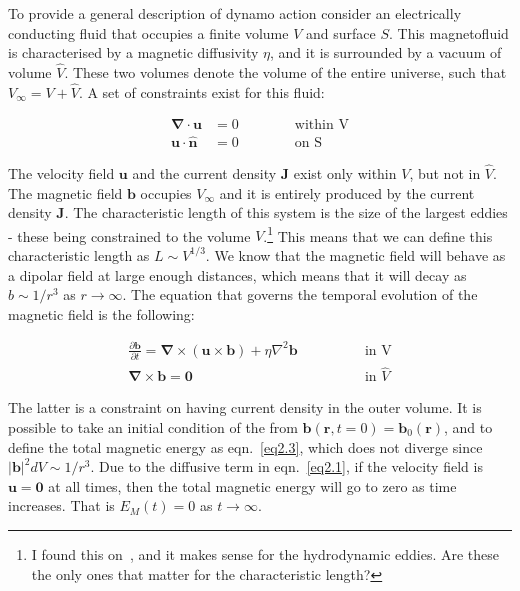 \documentclass[a4paper,12pt]{article}
\begin{document}
To provide a general description of dynamo action consider an electrically conducting fluid that occupies a finite volume $V$ and surface $S$. This magnetofluid is characterised by a magnetic diffusivity $\eta$, and it is surrounded by a vacuum of volume $\hat{V}$. These two volumes denote the volume of the entire universe, such that $V_\infty = V + \hat{V}$. A set of constraints exist for this fluid:

\begin{align}
 \bm \nabla \cdot \bm u &= 0 \qquad \qquad \text{within V} \nonumber\\
 \bm u \cdot \bm{\hat{n}} &= 0 \qquad \qquad \text{on S} \nonumber
\end{align}

The velocity field $\bm u$ and the current density $\bm J$ exist only within $V$, but not in $\hat{V}$. The magnetic field $\bm b$ occupies $V_\infty$ and it is entirely produced by the current density $\bm J$. The characteristic length of this system is the size of the largest eddies - these being constrained to the volume $V$.\footnote{I found this on~\cite{schnack2009lectures}, and it makes sense for the hydrodynamic eddies. Are these the only ones that matter for the characteristic length?} This means that we can define this characteristic length as $L \sim V^{1/3}$. We know that the magnetic field will behave as a dipolar field at large enough distances, which means that it will decay as $b \sim 1/r^3$ as $r \rightarrow \infty$. The equation that governs the temporal evolution of the magnetic field is the following: 

\begin{align}
 \frac{\partial \bm b}{\partial t} = \bm \nabla \times (\bm u \times \bm b) + \eta \nabla^2 \bm b \qquad \qquad &\text{in V}
 \label{eq2.1} \\
 \bm \nabla \times \bm b = \bm 0 \qquad \qquad &\text{in $\hat{V}$} \label{eq2.2}
\end{align}

The latter is a constraint on having current density in the outer volume. It is possible to take an initial condition of the from $\bm b(\bm r, t=0) = \bm b_0(\bm r)$, and to define the total magnetic energy as eqn.~\ref{eq2.3}, which does not diverge since $\vert \bm b \vert^2 dV \sim 1/r^3$. Due to the diffusive term in eqn.~\ref{eq2.1}, if the velocity field is $\bm u = \bm 0$ at all times, then the total magnetic energy will go to zero as time increases. That is $E_M(t) = 0$ as $t \rightarrow \infty$.
\end{document}
